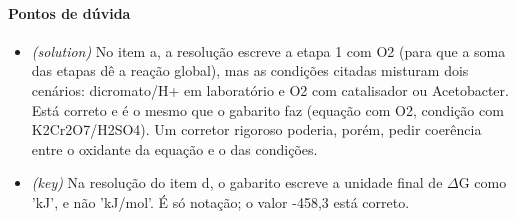 \documentclass{article}%
\begin{document}
\paragraph{Pontos de dúvida}%
\begin{itemize}%
\item%
\textit{(solution)} No item a, a resolução escreve a etapa 1 com O2 (para que a soma das etapas dê a reação global), mas as condições citadas misturam dois cenários: dicromato/H+ em laboratório e O2 com catalisador ou Acetobacter. Está correto e é o mesmo que o gabarito faz (equação com O2, condição com K2Cr2O7/H2SO4). Um corretor rigoroso poderia, porém, pedir coerência entre o oxidante da equação e o das condições.%
\item%
\textit{(key)} Na resolução do item d, o gabarito escreve a unidade final de $\Delta$G como 'kJ', e não 'kJ/mol'. É só notação; o valor -458,3 está correto.%
\end{itemize}%
\end{document}
